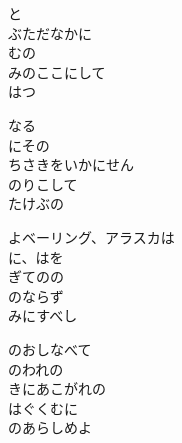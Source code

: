 \documentclass[10pt,b5j]{tarticle} %
\begin{document}
\vspace{1.5em} %
\newcommand{\linespace}{0.5em} %
\newcommand{\blocksize}{0.5\hsize} %
\begin{enumerate} %
    \begin{minipage}[c]{\blocksize}
    
        \vspace{\linespace}
        \item
        と\\
        ぶただなかに\\
        むの\\
        みのここにして\\
        はつ
        
        \vspace{\linespace}
        \item
        なる\\
        にその\\
        ちさきをいかにせん\\
        のりこして\\
        たけぶの
        
        \vspace{\linespace}
        \item
        よベーリング、アラスカは\\
        に、はを\\
        ぎてのの\\
        のならず\\
        みにすべし
        
        \vspace{\linespace}
        \item
        のおしなべて\\
        のわれの\\
        きにあこがれの\\
        はぐくむに\\
        のあらしめよ
    
    \end{minipage}
\end{enumerate} %
\end{document}
